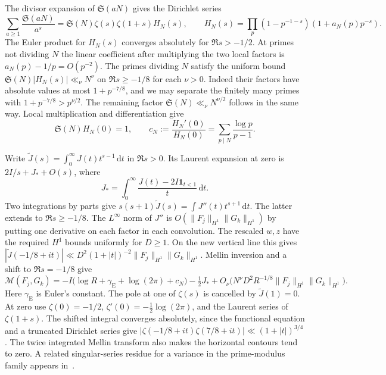 \documentclass[11pt,a4paper]{article}
\numberwithin{equation}{section}
\newcommand{\SSS}{\mathfrak S}
\newcommand{\ud}{\mathrm d}
\begin{document}
The divisor expansion of $\SSS(aN)$ gives the Dirichlet series
\[
 \sum_{a\ge1}\frac{\SSS(aN)}{a^s}
 =\SSS(N)\zeta(s)\zeta(1+s)H_N(s),\qquad
 H_N(s)=\prod_p(1-p^{-1-s})(1+a_N(p)p^{-s}).
\]
The Euler product for $H_N(s)$ converges absolutely for
$\Re s>-1/2$. At primes not dividing $N$ the linear coefficient
after multiplying the two local factors is $a_N(p)-1/p=O(p^{-2})$.
The primes dividing $N$ satisfy the uniform bound
$\SSS(N)|H_N(s)|\ll_\nu N^\nu$ on $\Re s\ge-1/8$ for each $\nu>0$.
Indeed their factors have absolute values at most $1+p^{-7/8}$,
and we may separate the finitely many primes with
$1+p^{-7/8}>p^{\nu/2}$. The remaining factor
$\SSS(N)\ll_\nu N^{\nu/2}$ follows in the same way.
Local multiplication and differentiation give
\begin{equation}
 \SSS(N)H_N(0)=1,\qquad
 c_N:=\frac{H_N'(0)}{H_N(0)}
       =\sum_{p\mid N}\frac{\log p}{p-1}.
 \label{eq:condconstant}
\end{equation}

Write $\widetilde J(s)=\int_0^\infty J(t)t^{s-1}\,\ud t$ in
$\Re s>0$. Its Laurent expansion at zero is $2I/s+J_*+O(s)$, where
\[
 J_*=\int_0^\infty\frac{J(t)-2I\mathbf1_{t<1}}{t}\,\ud t.
\]
Two integrations by parts give
$s(s+1)\widetilde J(s)=\int J''(t)t^{s+1}\,\ud t$.
The latter extends to $\Re s\ge-1/8$.
The $L^\infty$ norm of $J''$ is
$O(\|F_j\|_{H^1}\|G_k\|_{H^1})$ by putting one derivative on
each factor in each convolution. The rescaled $w,z$ have the
required $H^1$ bounds uniformly for $D\ge1$. On the new vertical
line this gives
$|\widetilde J(-1/8+it)|\ll D^2(1+|t|)^{-2}
\|F_j\|_{H^1}\|G_k\|_{H^1}$.
Mellin inversion and a shift to $\Re s=-1/8$ give
\begin{equation}
 \mathcal M(F_j,G_k)
   =-I\bigl(\log R+\gamma_{\mathrm E}+\log(2\pi)+c_N\bigr)
      -\tfrac12 J_*
      +O_\nu\bigl(N^\nu D^2 R^{-1/8}
                   \|F_j\|_{H^1}\|G_k\|_{H^1}\bigr).
 \label{eq:modelresidue}
\end{equation}
Here $\gamma_{\mathrm E}$ is Euler's constant. The pole at one of
$\zeta(s)$ is cancelled by $\widetilde J(1)=0$. At zero use
$\zeta(0)=-1/2$, $\zeta'(0)=-\tfrac12\log(2\pi)$, and the
Laurent series of $\zeta(1+s)$. The shifted integral converges
absolutely, since the functional equation and a truncated
Dirichlet series give
$|\zeta(-1/8+it)\zeta(7/8+it)|\ll (1+|t|)^{3/4}$.
The twice integrated Mellin transform also makes the horizontal
contours tend to zero. A related singular-series residue for a
variance in the prime-modulus family appears in~\cite[Section~8]{TZLiu}.
\end{document}
